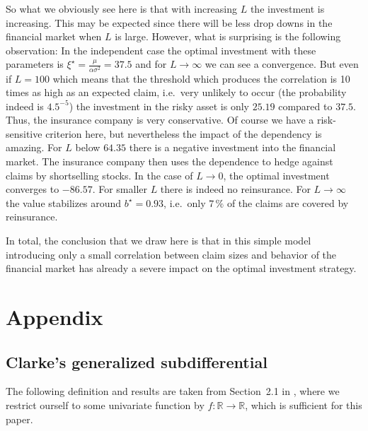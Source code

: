 \documentclass[reqno, 11pt]{amsart}%
\newcommand{\R}{\mathbb{R}}
\theoremstyle{definition}
\numberwithin{equation}{section} \numberwithin{theorem}{section}
\begin{document}
So what we obviously see here is that with increasing $L$ the investment is increasing. This may be expected since there will be less drop downs in the financial market when $L$ is large.  However, what is surprising is the following observation:  In the independent case the optimal investment with these parameters is $\xi^\star=\frac{\mu}{\alpha\sigma^2}=37.5$ and for $L\to\infty$ we can see a convergence. But even if $L=100$ which means that the threshold which produces the correlation is 10 times as high as an expected claim, i.e.\ very unlikely to occur (the probability indeed is $4.5^{-5}$) the investment in the risky asset is only $25.19$ compared to $37.5$. Thus, the insurance company is very conservative.  Of course we have a risk-sensitive criterion here, but nevertheless the impact of the dependency is amazing. For $L$ below $64.35$ there is a negative investment into the financial market.
The insurance company then uses the dependence to hedge against claims by shortselling stocks.
In the case of $L\to0$, the optimal investment converges to $-86.57$.
For smaller $L$ there is indeed no reinsurance.  
For $L\to\infty$ the value stabilizes around $b^\star=0.93$, i.e.\  only  $7\,\%$ of the claims are covered by reinsurance.

 In total, the conclusion that we draw here is that in this simple model introducing only a small correlation between claim sizes and behavior of the financial market has already a severe impact on the optimal investment strategy.


\section{Appendix}\label{sec:app}

\subsection{Clarke's generalized subdifferential}
The following definition and results are taken from Section~2.1 in \cite{Clarke1983}, where we restrict ourself to some univariate function by $f:\R\to\R$, which is sufficient for this paper.
\end{document}
